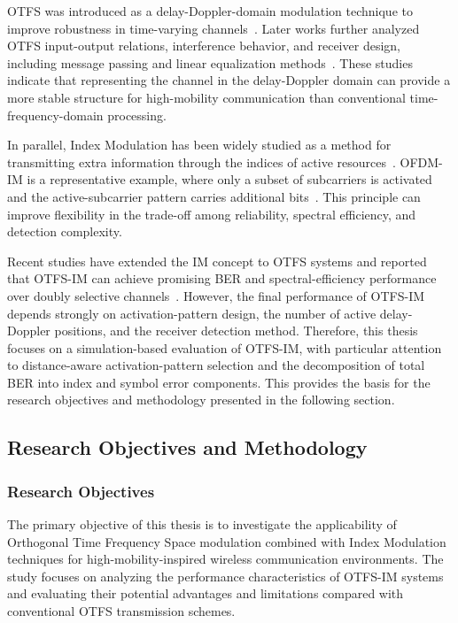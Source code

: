 OTFS was introduced as a delay-Doppler-domain modulation technique to improve robustness in time-varying channels~\cite{Hadani2017OTFSWCNC,Hadani2018OTFS,Wei2020OTFSPromising,Hong2019OTFSTutorial}. Later works further analyzed OTFS input-output relations, interference behavior, and receiver design, including message passing and linear equalization methods~\cite{Raviteja2018OTFSMP,Raviteja2018OTFSInterference,Surabhi2020LinearEqualization}. These studies indicate that representing the channel in the delay-Doppler domain can provide a more stable structure for high-mobility communication than conventional time-frequency-domain processing.

In parallel, Index Modulation has been widely studied as a method for transmitting extra information through the indices of active resources~\cite{Basar2016IndexMod5G,Cheng2017IndexMod5G,DoganTusha2020MultidimIM}. OFDM-IM is a representative example, where only a subset of subcarriers is activated and the active-subcarrier pattern carries additional bits~\cite{Wen2017OFDMIM}. This principle can improve flexibility in the trade-off among reliability, spectral efficiency, and detection complexity.

Recent studies have extended the IM concept to OTFS systems and reported that OTFS-IM can achieve promising BER and spectral-efficiency performance over doubly selective channels~\cite{Liang2020OTFSIM,Qian2022BlockWiseOTFSIM,Qian2023ReceiverOTFSIM,Wu2024OTFSIMDetector}. However, the final performance of OTFS-IM depends strongly on activation-pattern design, the number of active delay-Doppler positions, and the receiver detection method. Therefore, this thesis focuses on a simulation-based evaluation of OTFS-IM, with particular attention to distance-aware activation-pattern selection and the decomposition of total BER into index and symbol error components. This provides the basis for the research objectives and methodology presented in the following section.

\subsection{Research Objectives and Methodology}

\subsubsection{Research Objectives}

The primary objective of this thesis is to investigate the applicability of Orthogonal Time Frequency Space modulation combined with Index Modulation techniques for high-mobility-inspired wireless communication environments. The study focuses on analyzing the performance characteristics of OTFS-IM systems and evaluating their potential advantages and limitations compared with conventional OTFS transmission schemes.

